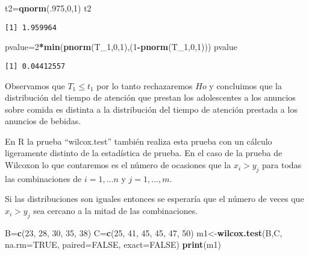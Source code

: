 \documentclass[a4paper,oneside,openany]{book}
\newenvironment{Shaded}{\begin{snugshade}}{\end{snugshade}}
\newcommand{\KeywordTok}[1]{\textcolor[rgb]{0.13,0.29,0.53}{\textbf{#1}}}
\newcommand{\DataTypeTok}[1]{\textcolor[rgb]{0.13,0.29,0.53}{#1}}
\newcommand{\DecValTok}[1]{\textcolor[rgb]{0.00,0.00,0.81}{#1}}
\newcommand{\OtherTok}[1]{\textcolor[rgb]{0.56,0.35,0.01}{#1}}
\newcommand{\OperatorTok}[1]{\textcolor[rgb]{0.81,0.36,0.00}{\textbf{#1}}}
\newcommand{\NormalTok}[1]{#1}
\begin{document}
\begin{Shaded}
\begin{Highlighting}[]
\NormalTok{t2=}\KeywordTok{qnorm}\NormalTok{(.}\DecValTok{975}\NormalTok{,}\DecValTok{0}\NormalTok{,}\DecValTok{1}\NormalTok{)}
\NormalTok{t2}
\end{Highlighting}
\end{Shaded}

\begin{verbatim}
[1] 1.959964
\end{verbatim}

\begin{Shaded}
\begin{Highlighting}[]
\NormalTok{pvalue=}\DecValTok{2}\OperatorTok{*}\KeywordTok{min}\NormalTok{(}\KeywordTok{pnorm}\NormalTok{(T_}\DecValTok{1}\NormalTok{,}\DecValTok{0}\NormalTok{,}\DecValTok{1}\NormalTok{),(}\DecValTok{1}\OperatorTok{-}\KeywordTok{pnorm}\NormalTok{(T_}\DecValTok{1}\NormalTok{,}\DecValTok{0}\NormalTok{,}\DecValTok{1}\NormalTok{)))}
\NormalTok{pvalue}
\end{Highlighting}
\end{Shaded}

\begin{verbatim}
[1] 0.04412557
\end{verbatim}

Observamos que \(T_1\leq t_1\) por lo tanto rechazaremos \(Ho\) y
concluimos que la distribución del tiempo de atención que prestan los
adolescentes a los anuncios sobre comida es distinta a la distribución
del tiempo de atención prestada a los anuncios de bebidas.

En R la prueba ``wilcox.test'' también realiza esta prueba con un
cálculo ligeramente distinto de la estadística de prueba. En el caso de
la prueba de Wilcoxon lo que contaremos es el número de ocasiones que la
\(x_i>y_j\) para todas las combinaciones de \(i=1,...n\) y
\(j=1,...,m\).

Si las distribuciones son iguales entonces se esperaría que el número de
veces que \(x_i>y_j\) sea cercano a la mitad de las combinaciones.

\begin{Shaded}
\begin{Highlighting}[]
\NormalTok{B=}\KeywordTok{c}\NormalTok{(}\DecValTok{23}\NormalTok{, }\DecValTok{28}\NormalTok{, }\DecValTok{30}\NormalTok{, }\DecValTok{35}\NormalTok{, }\DecValTok{38}\NormalTok{)}
\NormalTok{C=}\KeywordTok{c}\NormalTok{(}\DecValTok{25}\NormalTok{, }\DecValTok{41}\NormalTok{, }\DecValTok{45}\NormalTok{, }\DecValTok{45}\NormalTok{, }\DecValTok{47}\NormalTok{, }\DecValTok{50}\NormalTok{)}
\NormalTok{m1<-}\KeywordTok{wilcox.test}\NormalTok{(B,C, }\DataTypeTok{na.rm=}\OtherTok{TRUE}\NormalTok{, }\DataTypeTok{paired=}\OtherTok{FALSE}\NormalTok{, }\DataTypeTok{exact=}\OtherTok{FALSE}\NormalTok{)}
\KeywordTok{print}\NormalTok{(m1)}
\end{Highlighting}
\end{Shaded}
\end{document}
